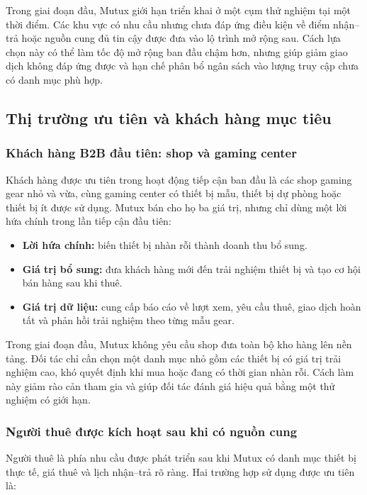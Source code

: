 Trong giai đoạn đầu, Mutux giới hạn triển khai ở một cụm thử nghiệm tại một thời điểm. Các khu vực có nhu cầu nhưng chưa đáp ứng điều kiện về điểm nhận--trả hoặc nguồn cung đủ tin cậy được đưa vào lộ trình mở rộng sau. Cách lựa chọn này có thể làm tốc độ mở rộng ban đầu chậm hơn, nhưng giúp giảm giao dịch không đáp ứng được và hạn chế phân bổ ngân sách vào lượng truy cập chưa có danh mục phù hợp.

\subsection{Thị trường ưu tiên và khách hàng mục tiêu}

\subsubsection{Khách hàng B2B đầu tiên: shop và gaming center}

Khách hàng được ưu tiên trong hoạt động tiếp cận ban đầu là các shop gaming gear nhỏ và vừa, cùng gaming center có thiết bị mẫu, thiết bị dự phòng hoặc thiết bị ít được sử dụng. Mutux bán cho họ ba giá trị, nhưng chỉ dùng một lời hứa chính trong lần tiếp cận đầu tiên:

\begin{itemize}
    \item \textbf{Lời hứa chính:} biến thiết bị nhàn rỗi thành doanh thu bổ sung.
    \item \textbf{Giá trị bổ sung:} đưa khách hàng mới đến trải nghiệm thiết bị và tạo cơ hội bán hàng sau khi thuê.
    \item \textbf{Giá trị dữ liệu:} cung cấp báo cáo về lượt xem, yêu cầu thuê, giao dịch hoàn tất và phản hồi trải nghiệm theo từng mẫu gear.
\end{itemize}

Trong giai đoạn đầu, Mutux không yêu cầu shop đưa toàn bộ kho hàng lên nền tảng. Đối tác chỉ cần chọn một danh mục nhỏ gồm các thiết bị có giá trị trải nghiệm cao, khó quyết định khi mua hoặc đang có thời gian nhàn rỗi. Cách làm này giảm rào cản tham gia và giúp đối tác đánh giá hiệu quả bằng một thử nghiệm có giới hạn.

\subsubsection{Người thuê được kích hoạt sau khi có nguồn cung}

Người thuê là phía nhu cầu được phát triển sau khi Mutux có danh mục thiết bị thực tế, giá thuê và lịch nhận--trả rõ ràng. Hai trường hợp sử dụng được ưu tiên là:

